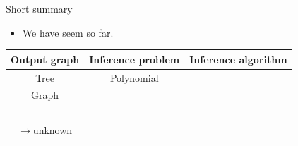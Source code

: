 \documentclass[first=dgreen,second=purple,logo=red]{aaltoslides}
\begin{document}
\begin{frame}{Short summary}
	\begin{itemize}\footnotesize
		\item We have seem so far.		
	\end{itemize}
		\begin{tabular}{|c|c|p{5.5cm}|}
			\hline
			\footnotesize
			 Output graph & Inference problem & Inference algorithm \\ \hline
			 Tree & Polynomial & \dpg\ \cite{Rousu07}  \\
			 Graph & \nphard & \lbp\ \cite{su10structured}  \\ 
			 \daggraph & \nphard & \sdp\ \cite{su14structured} \\ 
			 $\rightarrow${unknown} & \nphard & \mve\ \amm\ \mam\ \cite{su15multilabel} \rta\ \cite{su14multilabelnips} \\ \hline
		\end{tabular}
\end{frame}
\end{document}
